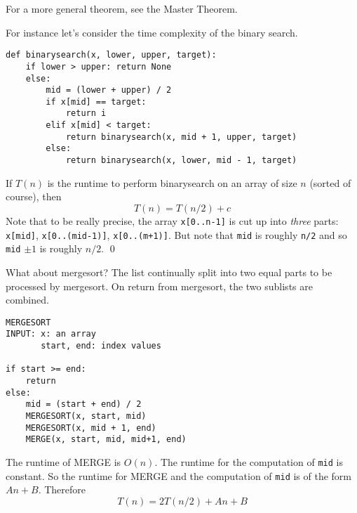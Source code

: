 For a more general theorem, see the Master Theorem.

\newpage
\begin{eg}
For instance let's consider the time complexity of the binary search.
\begin{Verbatim}[frame=single,fontsize=\footnotesize]
def binarysearch(x, lower, upper, target):
    if lower > upper: return None
    else:
        mid = (lower + upper) / 2
        if x[mid] == target:
            return i
        elif x[mid] < target:
            return binarysearch(x, mid + 1, upper, target)
        else:
            return binarysearch(x, lower, mid - 1, target)
\end{Verbatim}
If $T(n)$ is the runtime to perform binarysearch on an
array of size $n$ (sorted of course), 
then 
\[
T(n) = T(n/2) + c
\]
Note that to be really precise, the array
\verb!x[0..n-1]! is cut up into
\textit{three} parts: \verb!x[mid]!, \verb!x[0..(mid-1)]!,
\verb!x[0..(m+1)]!.
But note that \verb!mid! is roughly \verb!n/2! and so
\verb!mid! $\pm 1$ is roughly
$n/2$.
\qed
\end{eg}


\newpage
\begin{eg}
What about mergesort? The list continually split into two equal parts
to be processed by mergesort. On return from mergesort, the two sublists
are combined.
\begin{Verbatim}[frame=single,fontsize=\footnotesize]
MERGESORT
INPUT: x: an array
       start, end: index values

if start >= end:
    return
else:
    mid = (start + end) / 2
    MERGESORT(x, start, mid)
    MERGESORT(x, mid + 1, end)
    MERGE(x, start, mid, mid+1, end)
\end{Verbatim}
The runtime of MERGE is $O(n)$.
The runtime for the computation of \verb!mid!
is constant.
So the runtime for MERGE and the computation of \verb!mid! is
of the form $An + B$.
Therefore
\[
T(n) = 2T(n/2) + An + B
\]
\end{eg}

